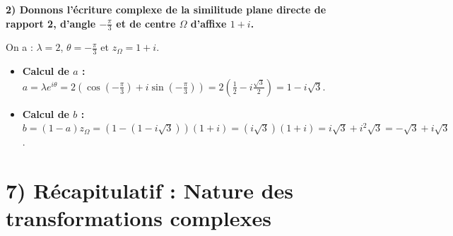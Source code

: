 \documentclass[12pt,a4paper]{article}
\begin{document}
\begin{center}
\end{center}

\textbf{2) Donnons l'écriture complexe de la similitude plane directe de rapport 2, d'angle \(-\frac{\pi}{3}\) et de centre \(\Omega\) d'affixe \(1 + i\).}

On a : \(\lambda = 2\), \(\theta = -\frac{\pi}{3}\) et \(z_{\Omega} = 1 + i\).
\begin{itemize}
    \item \textbf{Calcul de \(a\) :} \(a = \lambda e^{i\theta} = 2 \left(\cos(-\frac{\pi}{3}) + i\sin(-\frac{\pi}{3})\right) = 2 \left(\frac{1}{2} - i\frac{\sqrt{3}}{2}\right) = 1 - i\sqrt{3}\).
    \item \textbf{Calcul de \(b\) :} \(b = (1 - a) z_{\Omega} = (1 - (1 - i\sqrt{3}))(1 + i) = (i\sqrt{3})(1 + i) = i\sqrt{3} + i^2\sqrt{3} = -\sqrt{3} + i\sqrt{3}\).
\end{itemize}

\begin{center}
\end{center}
\newpage
\section*{7) Récapitulatif : Nature des transformations complexes}
\end{document}
